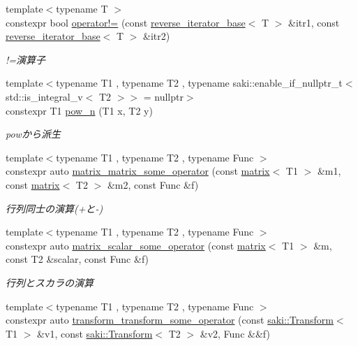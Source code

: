 \begin{DoxyCompactItemize}
{\footnotesize template$<$typename T $>$ }\\constexpr bool \mbox{\hyperlink{namespacesaki_1_1details_a67a43f1e216aa1da9934815a21bfe2ee}{operator!=}} (const \mbox{\hyperlink{classsaki_1_1details_1_1reverse__iterator__base}{reverse\+\_\+iterator\+\_\+base}}$<$ T $>$ \&itr1, const \mbox{\hyperlink{classsaki_1_1details_1_1reverse__iterator__base}{reverse\+\_\+iterator\+\_\+base}}$<$ T $>$ \&itr2)
\begin{DoxyCompactList}\small\item\em !=演算子 \end{DoxyCompactList}\item 
{\footnotesize template$<$typename T1 , typename T2 , typename saki\+::enable\+\_\+if\+\_\+nullptr\+\_\+t$<$ std\+::is\+\_\+integral\+\_\+v$<$ T2 $>$$>$  = nullptr$>$ }\\constexpr T1 \mbox{\hyperlink{namespacesaki_1_1details_a30b4cd78c970618ee2886123c28e4041}{pow\+\_\+n}} (T1 x, T2 y)
\begin{DoxyCompactList}\small\item\em powから派生 \end{DoxyCompactList}\item 
{\footnotesize template$<$typename T1 , typename T2 , typename Func $>$ }\\constexpr auto \mbox{\hyperlink{namespacesaki_1_1details_a95cd387e134b1b940cde0b171926e01e}{matrix\+\_\+matrix\+\_\+some\+\_\+operator}} (const \mbox{\hyperlink{classsaki_1_1matrix}{matrix}}$<$ T1 $>$ \&m1, const \mbox{\hyperlink{classsaki_1_1matrix}{matrix}}$<$ T2 $>$ \&m2, const Func \&f)
\begin{DoxyCompactList}\small\item\em 行列同士の演算(+と-\/) \end{DoxyCompactList}\item 
{\footnotesize template$<$typename T1 , typename T2 , typename Func $>$ }\\constexpr auto \mbox{\hyperlink{namespacesaki_1_1details_aa3d3214e16ce99b6f4aca7d61d41077f}{matrix\+\_\+scalar\+\_\+some\+\_\+operator}} (const \mbox{\hyperlink{classsaki_1_1matrix}{matrix}}$<$ T1 $>$ \&m, const T2 \&scalar, const Func \&f)
\begin{DoxyCompactList}\small\item\em 行列とスカラの演算 \end{DoxyCompactList}\item 
{\footnotesize template$<$typename T1 , typename T2 , typename Func $>$ }\\constexpr auto \mbox{\hyperlink{namespacesaki_1_1details_ac8ab9fdbf09089a0272297c3be7c51d4}{transform\+\_\+transform\+\_\+some\+\_\+operator}} (const \mbox{\hyperlink{classsaki_1_1_transform}{saki\+::\+Transform}}$<$ T1 $>$ \&v1, const \mbox{\hyperlink{classsaki_1_1_transform}{saki\+::\+Transform}}$<$ T2 $>$ \&v2, Func \&\&f)

\end{DoxyCompactItemize}
